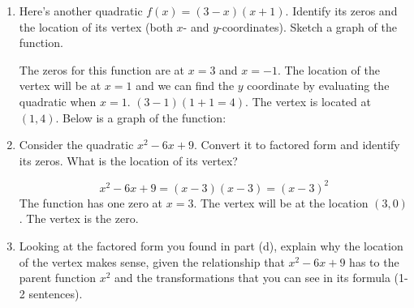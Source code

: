 \documentclass{article}
\begin{document}
\begin{enumerate}
\begin{enumerate}
    \begin{solution}
        The vertex is at $(0,12)$ as $x=0$ is directly between $-2$ and $2$. Evaluating $3x^2+12$ when $x=0$ gives us the $y-$coordinate of our vertex, and we see that this is 12. 
    \end{solution}
    
    \item Here's another quadratic $f(x)=(3-x)(x+1)$. Identify its zeros and the location of its vertex (both $x$- and $y$-coordinates). Sketch a graph of the function.
    \begin{problemonly}
         \vfill
         
    \end{problemonly}

    \begin{solution}
        The zeros for this function are at $x=3$ and $x=-1$. The location of the vertex will be at $x=1$ and we can find the $y$ coordinate by evaluating the quadratic when $x=1$. $(3-1)(1+1=4)$. The vertex is located at $(1, 4)$. Below is a graph of the function:


        
    \end{solution}
    
    \item Consider the quadratic $x^2-6x+9$. Convert it to factored form and identify its zeros. What is the location of its vertex?
    \begin{problemonly}
         \vfill
    \end{problemonly}
    
    \begin{solution}
        $$x^2-6x+9=(x-3)(x-3)=(x-3)^2$$
        The function has one zero at $x=3$. The vertex will be at the location $(3,0)$. The vertex is the zero.
    \end{solution}
    \item Looking at the factored form you found in part (d), explain why the location of the vertex makes sense, given the relationship that $x^2-6x+9$ has to the parent function $x^2$ and the transformations that you can see in its formula (1-2 sentences).
    \begin{problemonly}
         \vfill
    \end{problemonly}
    

\end{enumerate}
\end{enumerate}
\end{document}
